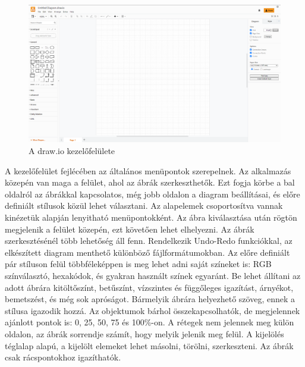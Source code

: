










\begin{figure}[!h]
	\includegraphics[width=\textwidth]{images/drawio.png}
	\caption{A draw.io kezelőfelülete \cite{drawio}}
\label{fig:drawio}
\end{figure}
A kezelőfelület fejlécében az általános menüpontok szerepelnek. Az alkalmazás közepén van maga a felület, ahol az ábrák szerkeszthetők. Ezt fogja körbe a bal oldalról az ábrákkal kapcsolatos, még jobb oldalon a diagram beállításai, és előre definiált stílusok közül lehet választani. Az alapelemek csoportosítva vannak kinézetük alapján lenyitható menüpontokként. Az ábra kiválasztása után rögtön megjelenik a felület közepén, ezt követően lehet elhelyezni. Az ábrák szerkesztésénél több lehetőség áll fenn. Rendelkezik Undo-Redo funkciókkal, az elkészített diagram menthető különböző fájlformátumokban. Az előre definiált pár stíluson felül többféleképpen is meg lehet adni saját színeket is: RGB színválasztó, hexakódok, és gyakran használt színek egyaránt. Be lehet állítani az adott ábrára kitöltőszínt, betűszínt, vízszintes és függőleges igazítást, árnyékot, bemetszést, és még sok apróságot. Bármelyik ábrára helyezhető szöveg, ennek a stílusa igazodik hozzá. Az objektumok bárhol összekapcsolhatók, de megjelennek ajánlott pontok is: 0, 25, 50, 75 és 100\%-on. A rétegek nem jelennek meg külön oldalon, az ábrák sorrendje számít, hogy melyik jelenik meg felül. A kijelölés téglalap alapú, a kijelölt elemeket lehet másolni, törölni, szerkeszteni. Az ábrák csak rácspontokhoz igazíthatók.


